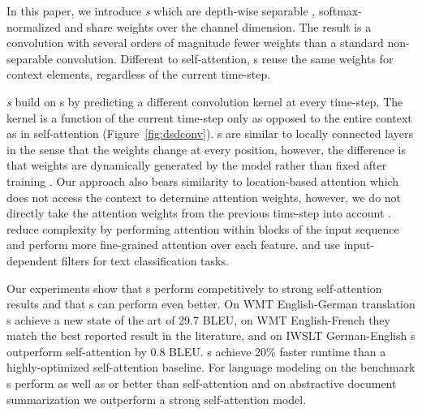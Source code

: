 In this paper, we introduce \emph{\sdconvfull{}s} which are depth-wise separable \citep{sifre2014rigid,Chollet2017XceptionDL,kaiser2017depthwise}, softmax-normalized and share weights over the channel dimension.
The result is a convolution with several orders of magnitude fewer weights than a standard non-separable convolution. 
Different to self-attention, \sdconvfull{}s reuse the same weights for context elements, regardless of the current time-step.

\emph{\Tvsdconvfull{}s} build on \sdconvfull{}s by predicting a different convolution kernel at every time-step. The kernel is a function of the current time-step only as opposed to the entire context as in self-attention (Figure~\ref{fig:dsdconv}).
\Tvsdconvfull{}s are similar to locally connected layers in the sense that the weights change at every position, however, the difference  is that weights are dynamically generated by the model rather than fixed after training \citep{lecun1998grad,taigman2014deepface,chen2015interspeech}.
Our approach also bears similarity to location-based attention which does not access the context to determine attention weights, however, we do not directly take the attention weights from the previous time-step into account \citep{chorowski2015asr,luong2015effective}.
\citet{shen2018block} reduce complexity by performing attention within blocks of the input sequence and 
\citet{shen2017disan,shen2018fast} perform more fine-grained attention over each feature.
\citet{shen2018emnlp} and \citet{gong2018emnlp} use input-dependent filters for text classification tasks.


Our experiments show that \sdconvfull{}s perform competitively to strong self-attention results and that \tvsdconvfull{}s can perform even better.
On WMT English-German translation \tvsdconvfull{}s achieve a new state of the art of 29.7 BLEU, on WMT English-French they match the best reported result in the literature, and on IWSLT German-English \tvsdconvfull{}s outperform self-attention by 0.8 BLEU.
\Tvsdconvfull{}s achieve 20\% faster runtime than a highly-optimized self-attention baseline.
For language modeling on the \gbw{} benchmark \tvsdconvfull{}s perform as well as or better than self-attention and on \cnndm{} abstractive document summarization we outperform a strong self-attention model.


